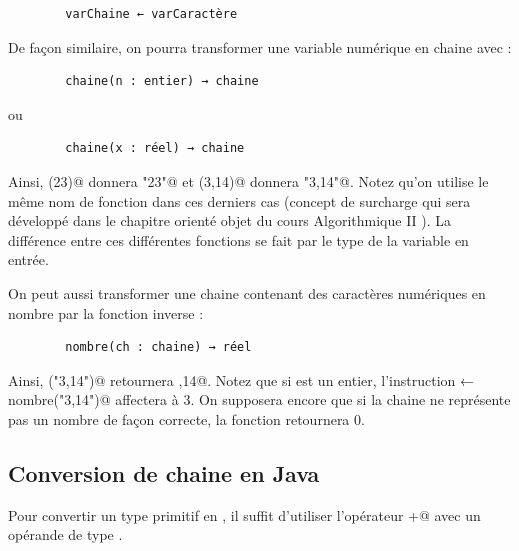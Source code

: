 \documentclass[11pt,a4paper]{article}
\begin{document}
            \par
        \begin{verbatim}
        varChaine ← varCaractère
      \end{verbatim}
        De fa\c con similaire, on pourra transformer une variable num\'erique en chaine avec :
      
            \par
        \begin{verbatim}
        chaine(n : entier) → chaine
      \end{verbatim}
        ou
      
            \par
        \begin{verbatim}
        chaine(x : réel) → chaine
      \end{verbatim}
        Ainsi, \verb@chaine(23)@ donnera \verb@"23"@ 
        et \verb@chaine (3,14)@ donnera \verb@"3,14"@. Notez qu'on utilise le m\^eme
        nom de fonction dans ces derniers cas (concept de \guillemotleft  surcharge \guillemotright  qui sera d\'evelopp\'e dans
        le chapitre orient\'e objet du cours \guillemotleft  Algorithmique II \guillemotright ). La diff\'erence entre ces diff\'erentes
        fonctions se fait par le type de la variable en entr\'ee.
      
            \par
        
        On peut aussi transformer une chaine contenant des caract\`eres num\'eriques en nombre par
        la fonction inverse :
      
            \par
        \begin{verbatim}
        nombre(ch : chaine) → réel
      \end{verbatim}
        Ainsi, \verb@nombre("3,14")@ retournera ,14@. 
        Notez que si \verb@n@ est un entier, l'instruction \verb@n ← nombre("3,14")@
        affectera \verb@n@ \`a 3.
        On supposera encore que si la chaine \verb@ch@ ne repr\'esente pas un nombre de fa\c con correcte, la
        fonction retournera 0.
		  
            \par
        \subsection{Conversion de chaine en Java}
		    Pour convertir un type primitif en \verb@String@, 
		    il suffit d'utiliser l'op\'erateur \verb@+@ 
		    avec un op\'erande de type \verb@String@.
      
\end{document}
